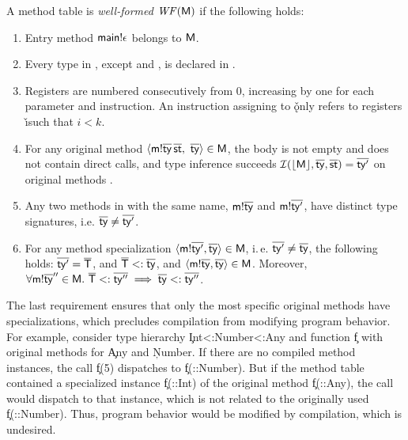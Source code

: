 \begin{definition}\label{ref:def-well-formed}
A method table is \emph{well-formed} $\mathit{WF}(\mathsf{M})$ if the following
holds:
\begin{enumerate}
\item Entry method $\mathsf{main}!{\epsilon}$ belongs to $\mathsf{M}$.
\item Every type \ty in \mtbl, except \int and \any, is declared in \tytbl.
\item Registers are numbered consecutively from 0, increasing by one for each
  parameter and instruction. An instruction assigning to \v\k only refers to
  registers \v\i such that $i<k$.
\item For any original method $\langle
  \mathsf{m}!{\overline{\mathsf{ty}}}\,\overline{\mathsf{st}},\ \overline{\mathsf{ty}} \rangle \in \mathsf{M}$, the body is
  not empty and does not contain direct calls, and type
  inference succeeds
  $\operatorname{\mathcal{I}}(\lfloor \mathsf{M} \rfloor, \overline{\mathsf{ty}}, \overline{\mathsf{st}})=\overline{\mathsf{ty}'}$
  on original methods \origmtbl\mtbl.
\item Any two methods in \mtbl with the same name,
  $\mathsf{m}!{\overline{\mathsf{ty}}}$ and $\mathsf{m}!{\overline{\mathsf{ty}'}}$, have distinct type
  signatures, i.e. $\overline{\mathsf{ty}} \neq \overline{\mathsf{ty}'}$.
  \item For any method specialization $\langle \mathsf{m}!{\overline{\mathsf{ty}'}}, \overline{\mathsf{ty}}\rangle\in\mathsf{M}$,
  i.\,e. $\overline{\mathsf{ty}'} \neq \overline{\mathsf{ty}}$, the following holds:
  $\overline{\mathsf{ty}'} = \overline{\mathsf{T}}$, and
  $\overline{\mathsf{T}} <: \overline{\mathsf{ty}}$, and
  $\langle \mathsf{m}!{\overline{\mathsf{ty}}}, \overline{\mathsf{ty}}\rangle\in\mathsf{M}$.
  Moreover,
   $\forall \mathsf{m}!{\overline{\mathsf{ty}}''} \in \mathsf{M}.\
      \overline{\mathsf{T}} <: \overline{\mathsf{ty}''} \implies \overline{\mathsf{ty}} <: \overline{\mathsf{ty}''}$.
\end{enumerate}
\end{definition}

The last requirement ensures that only the most specific original methods have
specializations, which precludes compilation from modifying program behavior.
%
For example, consider type hierarchy
\c{Int<:Number<:Any} and function \c{f} with original methods for \c{Any} and
\c{Number}. If there are no compiled method instances, the call \c{f(5)}
dispatches to \c{f(::Number)}. But if the method table contained a specialized
instance \c{f(::Int)} of the original method \c{f(::Any)}, the call would dispatch
to that instance, which is not related to the originally used \c{f(::Number)}.
Thus, program behavior would be modified by compilation, which is undesired.

